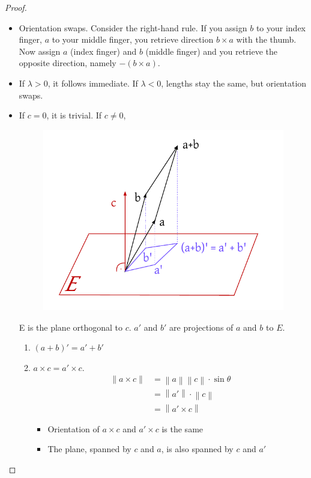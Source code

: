 \documentclass[a4paper]{article}
\numberwithin{lecref}{section}
\newcommand{\norm}[1]{\left\|#1\right\|}
\begin{document}
\begin{proof}
  \begin{itemize}
    \item Orientation swaps. Consider the right-hand rule. If you assign $b$ to your index finger, $a$ to your middle finger, you retrieve direction $b \times a$ with the thumb. Now assign $a$ (index finger) and $b$ (middle finger) and you retrieve the opposite direction, namely $- \left(b \times a\right)$.
    \item If $\lambda > 0$, it follows immediate.
      If $\lambda < 0$, lengths stay the same, but orientation swaps.
    \item If $c = 0$, it is trivial. If $c \neq 0$,
      \begin{figure}[!ht]
        \begin{center}
          \includegraphics{img/04_apbmc_eq_amcpbmc.pdf}
        \end{center}
      \end{figure}
      E is the plane orthogonal to $c$. $a'$ and $b'$ are projections of $a$ and $b$ to $E$.

      \begin{enumerate}
        \item $(a+b)' = a' + b'$
        \item $a \times c = a' \times c$.
          \begin{align*}
            \norm{a \times c} &= \norm a \norm c \cdot \sin\theta \\
              &= \norm{a'} \cdot \norm{c} \\
              &= \norm{a' \times c}
          \end{align*}
          \begin{itemize}
            \item Orientation of $a \times c$ and $a' \times c$ is the same
            \item The plane, spanned by $c$ and $a$, is also spanned by $c$ and $a'$
          \end{itemize}


\end{enumerate}
\end{itemize}
\end{proof}
\end{document}
